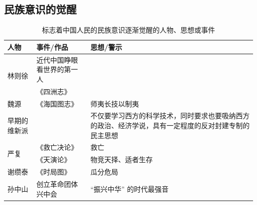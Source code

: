\documentclass[10pt, UTF8]{book} %
\begin{document}
\subsection{民族意识的觉醒}











\begin{table}[H]
    \centering
    \caption{标志着中国人民的民族意识逐渐觉醒的人物、思想或事件}
    \begin{tabular}{p{} p{} p{}}
        \toprule
        人物 & 事件/作品 & 思想/警示 \\ 
        \midrule
        \multirow{2}{*}{林则徐} & 近代中国睁眼看世界的第一人 \\ 
        & 《四洲志》 \\
        魏源 & 《海国图志》 & 师夷长技以制夷 \\
        早期的维新派 & & 不仅要学习西方的科学技术，同时要求也要吸纳西方的政治、经济学说，具有一定程度的反对封建专制的民主思想 \\
        \multirow{2}{*}{严复} & 《救亡决论》 & 救亡 \\ 
        & 《天演论》 & 物竞天择、适者生存 \\
        谢缵泰 & 《时局图》 & 瓜分危局 \\
        孙中山 & 创立革命团体兴中会 & “振兴中华” 的时代最强音 \\
        \bottomrule
    \end{tabular}    
\end{table}
\end{document}
